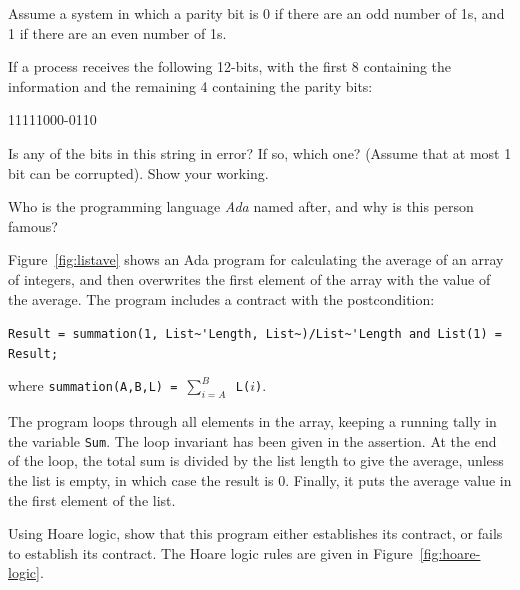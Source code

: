 Assume a system in which a parity bit is 0 if there are an odd number of 1s, and 1 if there are an even number of 1s.

If a process receives the following 12-bits, with the first 8 containing the information and the remaining 4 containing the parity bits:
\begin{center}
   11111000-0110
\end{center}
Is any of the bits in this string in error? If so, which one? (Assume that at most 1 bit can be corrupted). Show your working.




Who is the programming language \emph{Ada} named after, and why is this person famous?



Figure~\ref{fig:listave} shows an Ada program for calculating the average of an array of integers, and then overwrites the first element of the array with the value of the average. The program includes a contract with the postcondition:

\noindent \verb+Result = summation(1, List~'Length, List~)/List~'Length and List(1) = Result;+

where   {\tt summation(A,B,L) = $\sum_{i=A}^{B}$ \tt L($i$)}.

The program loops through all elements in the array, keeping a running tally in the variable {\tt Sum}. The loop invariant has been given in the assertion. At the end of the loop, the total sum is divided by the list length to give the average, unless the list is empty, in which case the result is 0. Finally, it puts the average value in the first element of the list.

Using Hoare logic, show that this program either establishes its contract, or fails to establish its contract. The Hoare logic rules are given in Figure~\ref{fig:hoare-logic}.

